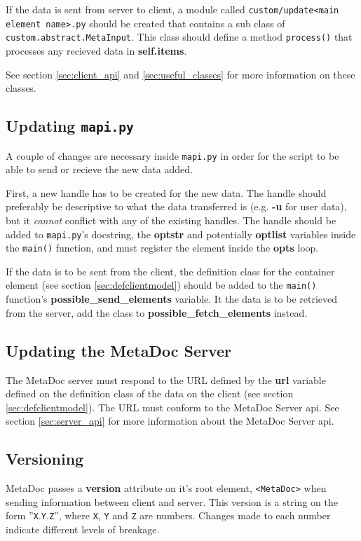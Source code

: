 If the data is sent from server to client, a module called
\texttt{custom/update<main element name>.py} should be created that contains a
sub class of \\ \texttt{custom.abstract.MetaInput}. This class should define a
method \texttt{process()} that processes any recieved data in
\textbf{self.items}.  

See section \ref{sec:client_api} and \ref{sec:useful_classes} for more
information on these classes.

\subsection{Updating \texttt{mapi.py}}
A couple of changes are necessary inside \texttt{mapi.py} in order for the
script to be able to send or recieve the new data added. 

First, a new handle has to be created for the new data. The handle should
preferably be descriptive to what the data transferred is (e.g. \textbf{-u} for
user data), but it \textit{cannot} conflict with any of the existing handles.
The handle should be added to \texttt{mapi.py}'s docstring, the \textbf{optstr}
and potentially \textbf{optlist} variables inside the \texttt{main()} function,
and must register the element inside the \textbf{opts} loop. 

If the data is to be sent from the client, the definition class for the
container element (see section \ref{sec:defclientmodel}) should be added to the
\texttt{main()} function's \textbf{possible\_send\_elements} variable. It the
data is to be retrieved from the server, add the class to
\textbf{possible\_fetch\_elements} instead.

\subsection{Updating the MetaDoc Server}
The MetaDoc server must respond to the URL defined by the \textbf{url} variable
defined on the definition class of the data on the client (see section
\ref{sec:defclientmodel}). The URL must conform to the MetaDoc Server
\gls{api}. See section \ref{sec:server_api} for more information about the
MetaDoc Server \gls{api}.

\subsection{Versioning}
\label{sec:version}
MetaDoc passes a \textbf{version} attribute on it's root element,
\texttt{<MetaDoc>} when sending information between client and server. This
version is a string on the form ''\texttt{X}.\texttt{Y}.\texttt{Z}'', where
\texttt{X}, \texttt{Y} and \texttt{Z} are numbers. Changes made to each number 
indicate different levels of breakage. 

